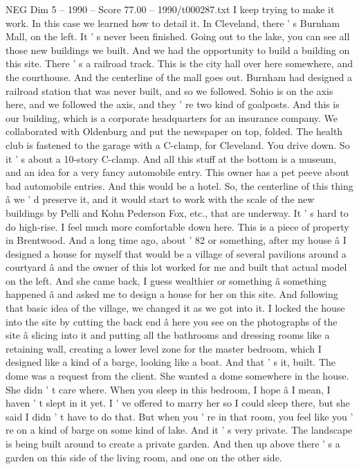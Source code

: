 \begin{textsample}{NEG Dim 5 – 1990 – Score 77.00 – 1990/t000287.txt}
I keep trying to make it work.
In this case we learned how to detail it.
In Cleveland, there ' s Burnham Mall, on the left.
It ' s never been finished.
Going out to the lake, you can see all those new buildings we built.
And we had the opportunity to build a building on this site.
There ' s a railroad track.
This is the city hall over here somewhere, and the courthouse.
And the centerline of the mall goes out.
Burnham had designed a railroad station that was never built, and so we followed.
Sohio is on the axis here, and we followed the axis, and they ' re two kind of goalposts.
And this is our building, which is a corporate headquarters for an insurance company.
We collaborated with Oldenburg and put the newspaper on top, folded.
The health club is fastened to the garage with a C-clamp, for Cleveland.
You drive down.
So it ' s about a 10-story C-clamp.
And all this stuff at the bottom is a museum, and an idea for a very fancy automobile entry.
This owner has a pet peeve about bad automobile entries.
And this would be a hotel.
So, the centerline of this thing â we ' d preserve it, and it would start to work with the scale of the new buildings by Pelli and Kohn Pederson Fox, etc., that are underway.
It ' s hard to do high-rise.
I feel much more comfortable down here.
This is a piece of property in Brentwood.
And a long time ago, about ' 82 or something, after my house â I designed a house for myself that would be a village of several pavilions around a courtyard â and the owner of this lot worked for me and built that actual model on the left.
And she came back, I guess wealthier or something â something happened â and asked me to design a house for her on this site.
And following that basic idea of the village, we changed it as we got into it.
I locked the house into the site by cutting the back end â here you see on the photographs of the site â slicing into it and putting all the bathrooms and dressing rooms like a retaining wall, creating a lower level zone for the master bedroom, which I designed like a kind of a barge, looking like a boat.
And that ' s it, built.
The dome was a request from the client.
She wanted a dome somewhere in the house.
She didn ' t care where.
When you sleep in this bedroom, I hope â I mean, I haven ' t slept in it yet.
I ' ve offered to marry her so I could sleep there, but she said I didn ' t have to do that.
But when you ' re in that room, you feel like you ' re on a kind of barge on some kind of lake.
And it ' s very private.
The landscape is being built around to create a private garden.
And then up above there ' s a garden on this side of the living room, and one on the other side.

\end{textsample}
